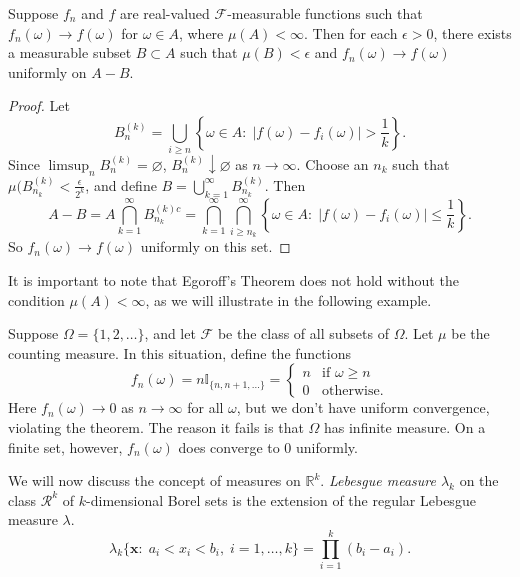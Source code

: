 \documentclass[11pt,fleqn]{book} %
\begin{document}
\begin{theorem} \label{thm:egoroff}
	Suppose $f_n$ and $f$ are real-valued $\mathcal{F}$-measurable functions such that $f_n(\omega) \to f(\omega)$ for $\omega \in A$, where $\mu(A) < \infty$. Then for each $\epsilon > 0$, there exists a measurable subset $B \subset A$ such that $\mu(B) < \epsilon$ and $f_n(\omega) \to f(\omega)$ uniformly on $A-B$.
\end{theorem}

\begin{proof}
	Let 
	\[
		B_n^{(k)} = \bigcup_{i \geq n} \left\{\omega \in A:\;|f(\omega)-f_i(\omega)| > \frac{1}{k}\right\}.
	\]
	Since $\limsup_n B_n^{(k)} = \varnothing$, $B_n^{(k)} \downarrow \varnothing$ as $n \to \infty$. Choose an $n_k$ such that $\mu(B_{n_k}^{(k)} < \frac{\epsilon}{2^k}$, and define $B = \bigcup_{k=1}^\infty B_{n_k}^{(k)}$. Then
	\[
		A-B = A \bigcap_{k=1}^\infty B_{n_k}^{(k)c} = \bigcap_{k=1}^\infty \bigcap_{i \geq n_k}^\infty \left\{ \omega \in A:\;|f(\omega)-f_i(\omega)| \leq \frac{1}{k} \right\}.
	\]
	So $f_n(\omega) \to f(\omega)$ uniformly on this set.
\end{proof}

It is important to note that Egoroff's Theorem does not hold without the condition $\mu(A) < \infty$, as we will illustrate in the following example.

\begin{example} \label{ex:egoroff-false}
	Suppose $\Omega = \{1,2,\dots\}$, and let $\mathcal{F}$ be the class of all subsets of $\Omega$. Let $\mu$ be the counting measure. In this situation, define the functions
	\[
		f_n(\omega) = n\mathbb{I}_{\{n,n+1,\dots\}} = \begin{cases}
			n & \textrm{if $\omega \geq n$} \\
			0 & \textrm{otherwise.}
		\end{cases}
	\]
	Here $f_n(\omega) \to 0$ as $n \to \infty$ for all $\omega$, but we don't have uniform convergence, violating the theorem. The reason it fails is that $\Omega$ has infinite measure. On a finite set, however, $f_n(\omega)$ does converge to 0 uniformly.
\end{example}

We will now discuss the concept of measures on $\mathbb{R}^k$. \emph{Lebesgue measure $\lambda_k$} on the class $\mathcal{R}^k$ of $k$-dimensional Borel sets is the extension of the regular Lebesgue measure $\lambda$.
\[
	\lambda_k\{\bm{x}:\;a_i < x_i < b_i,\;i=1,\dots,k\} = \prod_{i=1}^k (b_i-a_i).
\]
\end{document}

